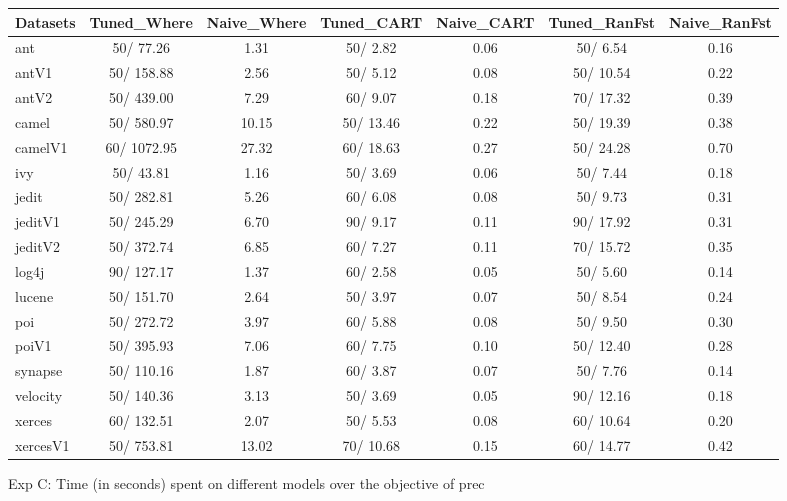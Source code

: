 \documentclass{acm_proc_article-sp}
\begin{document}
\begin{figure*}[!ht]
\scriptsize
\centering
  \begin{tabular}{l|c |c |c |c |c |c }
    \hline\hline
    Datasets & Tuned\_Where & Naive\_Where & Tuned\_CART & Naive\_CART & Tuned\_RanFst & Naive\_RanFst\\
    \hline
    ant & 50/ 77.26 & 1.31 & 50/ 2.82 & 0.06 & 50/ 6.54 & 0.16\\
    antV1 & 50/ 158.88 & 2.56 & 50/ 5.12 & 0.08 & 50/ 10.54 & 0.22\\
    antV2 & 50/ 439.00 & 7.29 & 60/ 9.07 & 0.18 & 70/ 17.32 & 0.39\\
    camel & 50/ 580.97 & 10.15 & 50/ 13.46 & 0.22 & 50/ 19.39 & 0.38\\
    camelV1 & 60/ 1072.95 & 27.32 & 60/ 18.63 & 0.27 & 50/ 24.28 & 0.70\\
    ivy & 50/ 43.81 & 1.16 & 50/ 3.69 & 0.06 & 50/ 7.44 & 0.18\\
    jedit & 50/ 282.81 & 5.26 & 60/ 6.08 & 0.08 & 50/ 9.73 & 0.31\\
    jeditV1 & 50/ 245.29 & 6.70 & 90/ 9.17 & 0.11 & 90/ 17.92 & 0.31\\
    jeditV2 & 50/ 372.74 & 6.85 & 60/ 7.27 & 0.11 & 70/ 15.72 & 0.35\\
    log4j & 90/ 127.17 & 1.37 & 60/ 2.58 & 0.05 & 50/ 5.60 & 0.14\\
    lucene & 50/ 151.70 & 2.64 & 50/ 3.97 & 0.07 & 50/ 8.54 & 0.24\\
    poi & 50/ 272.72 & 3.97 & 60/ 5.88 & 0.08 & 50/ 9.50 & 0.30\\
    poiV1 & 50/ 395.93 & 7.06 & 60/ 7.75 & 0.10 & 50/ 12.40 & 0.28\\
    synapse & 50/ 110.16 & 1.87 & 60/ 3.87 & 0.07 & 50/ 7.76 & 0.14\\
    velocity & 50/ 140.36 & 3.13 & 50/ 3.69 & 0.05 & 90/ 12.16 & 0.18\\
    xerces & 60/ 132.51 & 2.07 & 50/ 5.53 & 0.08 & 60/ 10.64 & 0.20\\
    xercesV1 & 50/ 753.81 & 13.02 & 70/ 10.68 & 0.15 & 60/ 14.77 & 0.42\\
  \end{tabular}
  \caption{Exp C: Time (in seconds) spent on different models over the objective of prec}
\end{figure*}
\end{document}
